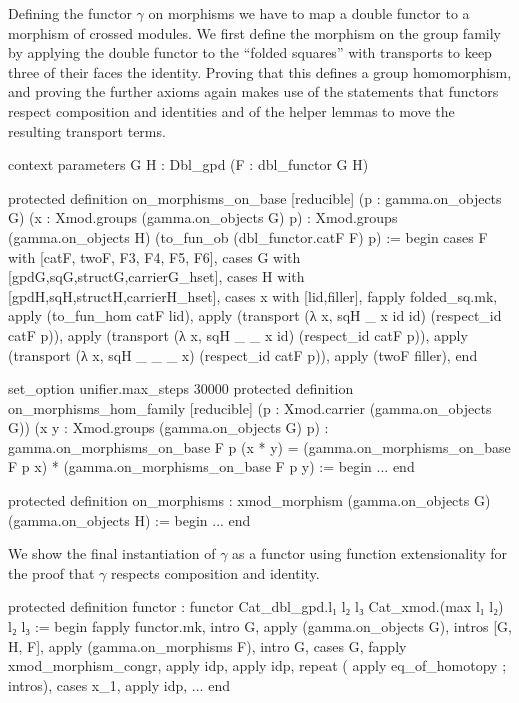 Defining the functor $\gamma$ on morphisms we have to map a double functor to a
morphism of crossed modules.
We first define the morphism on the group family by applying the double functor
to the ``folded squares'' with transports to keep three of their faces the identity.
Proving that this defines a group homomorphism, and proving the further axioms
again makes use of the statements that functors respect composition and identities
and of the helper lemmas to move the resulting transport terms.
\begin{leancodebr}
  context
  parameters {G H : Dbl_gpd} (F : dbl_functor G H)

  protected definition on_morphisms_on_base [reducible]
    (p : gamma.on_objects G) (x : Xmod.groups (gamma.on_objects G) p) :
    Xmod.groups (gamma.on_objects H) (to_fun_ob (dbl_functor.catF F) p) :=
  begin
    cases F with [catF, twoF, F3, F4, F5, F6],
    cases G with [gpdG,sqG,structG,carrierG_hset],
    cases H with [gpdH,sqH,structH,carrierH_hset],
    cases x with [lid,filler],
    fapply folded_sq.mk, apply (to_fun_hom catF lid),
    apply (transport (λ x, sqH _ x id id) (respect_id catF p)),
    apply (transport (λ x, sqH _ _ x id) (respect_id catF p)),
    apply (transport (λ x, sqH _ _ _ x) (respect_id catF p)),
    apply (twoF filler),
  end

  set_option unifier.max_steps 30000
  protected definition on_morphisms_hom_family [reducible]
    (p : Xmod.carrier (gamma.on_objects G)) 
    (x y : Xmod.groups (gamma.on_objects G) p) :
    gamma.on_morphisms_on_base F p (x * y) =
    (gamma.on_morphisms_on_base F p x) * (gamma.on_morphisms_on_base F p y) :=
  begin
    ...
  end
  
  protected definition on_morphisms :
    xmod_morphism (gamma.on_objects G) (gamma.on_objects H) :=
  begin
    ...
  end
\end{leancodebr}

We show the final instantiation of $\gamma$ as a functor using function extensionality
for the proof that $\gamma$ respects composition and identity.
\begin{leancodebr}
  protected definition functor :
    functor Cat_dbl_gpd.{l₁ l₂ l₃} Cat_xmod.{(max l₁ l₂) l₂ l₃} :=
  begin
    fapply functor.mk,
      intro G, apply (gamma.on_objects G),
      intros [G, H, F], apply (gamma.on_morphisms F),
      intro G, cases G,
        fapply xmod_morphism_congr, apply idp, apply idp,
        repeat ( apply eq_of_homotopy ; intros), cases x_1, apply idp,
    ...
  end
\end{leancodebr}

